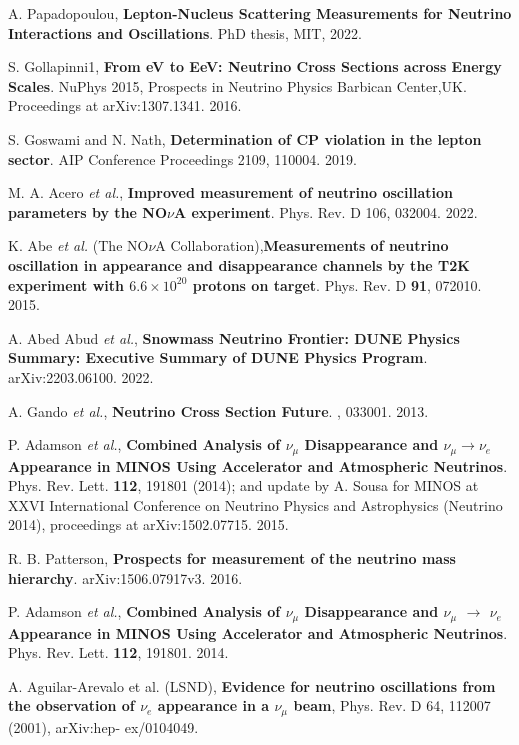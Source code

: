  A. Papadopoulou, \textbf{Lepton-Nucleus Scattering Measurements for Neutrino Interactions and Oscillations}. PhD thesis, MIT, 2022. 

 S. Gollapinni1, \textbf{From eV to EeV: Neutrino Cross Sections across Energy Scales}. NuPhys 2015, Prospects in Neutrino Physics Barbican Center,UK. Proceedings at arXiv:1307.1341. 2016.

 S. Goswami  and N. Nath, \textbf{Determination of CP violation in the lepton sector}. AIP Conference Proceedings 2109, 110004. 2019.

 M. A. Acero \textit{et al.}, \textbf{Improved measurement of neutrino oscillation
parameters by the NO$\nu$A experiment}. Phys. Rev. D 106, 032004. 2022.

 K. Abe \textit{et al.} (The NO$\nu$A Collaboration),\textbf{Measurements of neutrino oscillation in appearance and disappearance channels by the T2K experiment with $6.6 \times 10^{20} $ protons on target}. Phys. Rev. D \textbf{91}, 072010. 2015.

 A. Abed Abud \textit{et al.}, \textbf{Snowmass Neutrino Frontier: DUNE Physics Summary: Executive Summary of DUNE Physics Program}. arXiv:2203.06100. 2022.

 A. Gando \textit{et al.}, \textbf{Neutrino Cross Section Future}. , 033001. 2013.

 P. Adamson \textit{et al.}, \textbf{Combined Analysis of $\nu_\mu$ Disappearance and $\nu_\mu \rightarrow \nu_e$ Appearance in MINOS Using Accelerator and Atmospheric Neutrinos}. Phys. Rev. Lett. \textbf{112}, 191801 (2014); and update by A. Sousa for MINOS at XXVI International
Conference on Neutrino Physics and Astrophysics (Neutrino 2014), proceedings at arXiv:1502.07715. 2015.

 R. B. Patterson, \textbf{Prospects for measurement of the neutrino mass hierarchy}. arXiv:1506.07917v3. 2016.

 P. Adamson \textit{et al.}, \textbf{Combined Analysis of $\nu_\mu$ Disappearance and $\nu_\mu$ $\rightarrow $ $\nu_e$ Appearance in MINOS Using Accelerator and Atmospheric Neutrinos}. Phys. Rev. Lett. \textbf{112}, 191801. 2014.

 A. Aguilar-Arevalo et al. (LSND), \textbf{Evidence for neutrino oscillations from the observation of $\nu_e$ appearance in a $\nu_{\mu}$ beam}, Phys. Rev. D 64, 112007 (2001), arXiv:hep- ex/0104049.

